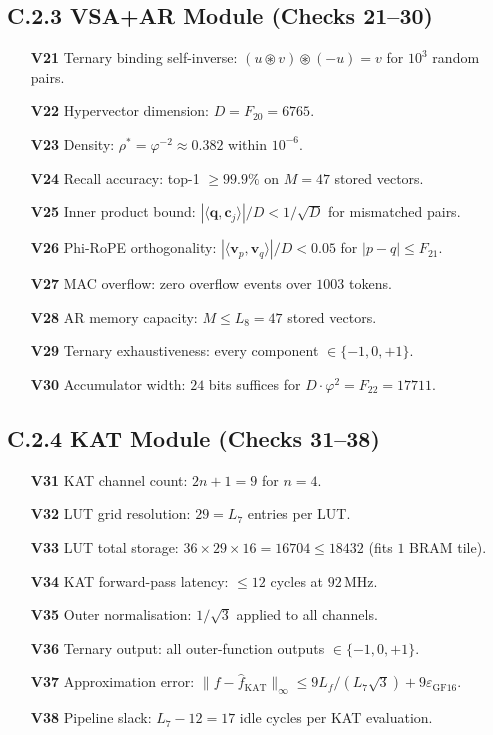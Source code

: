\subsection*{C.2.3 VSA+AR Module (Checks 21--30)}

\begin{enumerate}
\item[\textbf{V21}] Ternary binding self-inverse: $(u \circledast v) \circledast (-u) = v$ for $10^3$ random pairs.
\item[\textbf{V22}] Hypervector dimension: $D = F_{20} = 6765$.
\item[\textbf{V23}] Density: $\rho^* = \varphi^{-2} \approx 0.382$ within $10^{-6}$.
\item[\textbf{V24}] Recall accuracy: top-1 $\geq 99.9\%$ on $M = 47$ stored vectors.
\item[\textbf{V25}] Inner product bound: $|\langle \mathbf{q}, \mathbf{c}_j \rangle| / D < 1/\sqrt{D}$ for mismatched pairs.
\item[\textbf{V26}] Phi-RoPE orthogonality: $|\langle \mathbf{v}_p, \mathbf{v}_q \rangle| / D < 0.05$ for $|p - q| \leq F_{21}$.
\item[\textbf{V27}] MAC overflow: zero overflow events over $1003$ tokens.
\item[\textbf{V28}] AR memory capacity: $M \leq L_8 = 47$ stored vectors.
\item[\textbf{V29}] Ternary exhaustiveness: every component $\in \{-1, 0, +1\}$.
\item[\textbf{V30}] Accumulator width: $24$ bits suffices for $D \cdot \varphi^2 = F_{22} = 17711$.
\end{enumerate}

\subsection*{C.2.4 KAT Module (Checks 31--38)}

\begin{enumerate}
\item[\textbf{V31}] KAT channel count: $2n + 1 = 9$ for $n = 4$.
\item[\textbf{V32}] LUT grid resolution: $29 = L_7$ entries per LUT.
\item[\textbf{V33}] LUT total storage: $36 \times 29 \times 16 = 16704 \leq 18432$ (fits $1$ BRAM tile).
\item[\textbf{V34}] KAT forward-pass latency: $\leq 12$ cycles at $92$\,MHz.
\item[\textbf{V35}] Outer normalisation: $1/\sqrt{3}$ applied to all channels.
\item[\textbf{V36}] Ternary output: all outer-function outputs $\in \{-1, 0, +1\}$.
\item[\textbf{V37}] Approximation error: $\|f - \hat{f}_{\mathrm{KAT}}\|_\infty \leq 9 L_f / (L_7 \sqrt{3}) + 9 \varepsilon_{\mathrm{GF16}}$.
\item[\textbf{V38}] Pipeline slack: $L_7 - 12 = 17$ idle cycles per KAT evaluation.
\end{enumerate}

